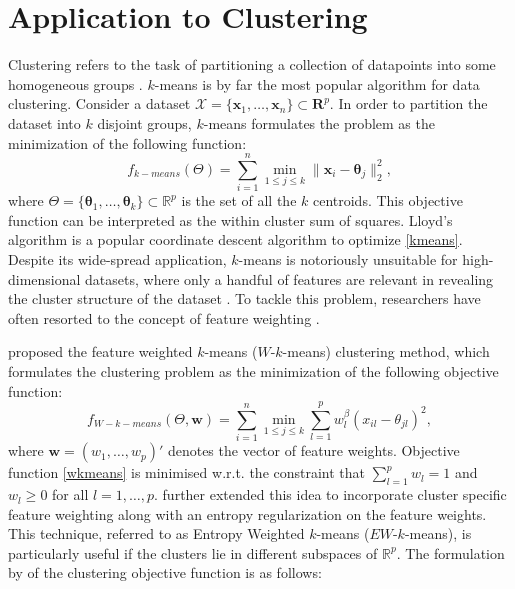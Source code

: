 \documentclass{article}
\newcommand{\bw}{\boldsymbol{w}}
\newcommand{\bx}{\boldsymbol{x}}
\newcommand{\btheta}{\boldsymbol{\theta}}
\begin{document}
\section{Application to Clustering}\label{clustering}
Clustering refers to the task of partitioning a collection of datapoints into some homogeneous groups \citep{wong2015short,xu2005survey}. $k$-means \citep{macqueen1967some} is by far the most popular algorithm for data clustering. Consider a dataset $\mathcal{X}=\{\bx_1,\dots,\bx_n\} \subset \mathbf{R}^p$. In order to partition the dataset into $k$ disjoint groups, $k$-means formulates the problem as the minimization of the following function:
\begin{equation}
\label{kmeans}
    f_{k-means}(\Theta)=\sum_{i=1}^n \min_{1 \leq j \leq k} \|\bx_i-\btheta_j\|_2^2,
\end{equation}
where $\Theta=\{\btheta_1,\dots,\btheta_k\} \subset \mathbb{R}^p$ is the set of all the $k$ centroids. This objective function  can be interpreted as the within cluster sum of squares. Lloyd's algorithm \citep{lloyd1982least} is a popular coordinate descent algorithm to optimize \eqref{kmeans}.   Despite its wide-spread application, $k$-means is notoriously unsuitable for high-dimensional datasets, where only a handful of features are relevant in revealing the cluster structure of the dataset \citep{chakraborty2020detecting}. To tackle this problem, researchers have often resorted to the concept of feature weighting \citep{de2016survey}. 
\par
\citep{huang2005automated} proposed the feature weighted $k$-means ($W$-$k$-means) clustering method, which formulates the clustering problem as the minimization of the following objective function:
\begin{equation}
\label{wkmeans}
f_{W-k-means}(\Theta,\bw)=\sum_{i=1}^n \min_{1 \leq j \leq k} \sum_{l=1}^p w_l^\beta (x_{il}-\theta_{jl})^2,
\end{equation}
where $\bw=(w_1,\dots,w_p)'$ denotes the vector of feature weights. Objective function \eqref{wkmeans} is minimised w.r.t. the constraint that $\sum_{l=1}^{p}w_l=1$ and $w_l \geq 0$ for all $l=1,\dots,p$. \cite{jing2007entropy} further extended this idea to incorporate cluster specific feature weighting along with an entropy regularization on the feature weights. This technique, referred to as Entropy Weighted $k$-means ($EW$-$k$-means), is particularly useful if the clusters lie in different subspaces of $\mathbb{R}^p$. The formulation by \cite{jing2007entropy} of the clustering objective function is as follows:
\end{document}
